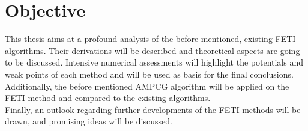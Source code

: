 \section{Objective}\label{sec:obective}
This thesis aims at a profound analysis of the before mentioned, existing FETI algorithms. Their derivations will be described and theoretical aspects are going to be discussed. Intensive numerical assessments will highlight the potentials and weak points of each method and will be used as basis for the final conclusions.\\
Additionally, the before mentioned AMPCG algorithm will be applied on the FETI method and compared to the existing algorithms.\\
Finally, an outlook regarding further developments of the FETI methods will be drawn, and promising ideas will be discussed.

